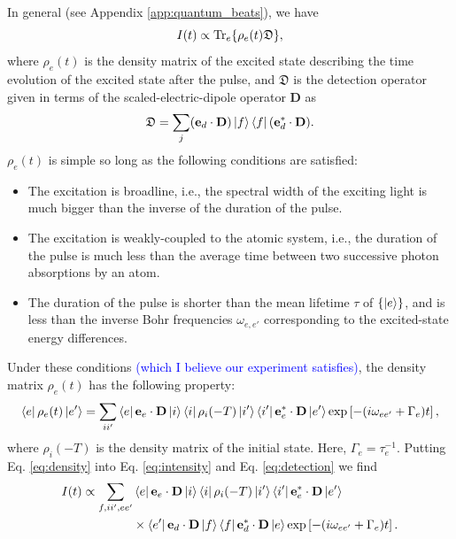 \documentclass[11pt]{article}
\newcommand{\lb}{\left[}
\newcommand{\rb}{\right]}
\begin{document}
In general (see Appendix \ref{app:quantum_beats}), we have
\begin{equation}\label{eq:intensity}
I(t) \propto \Tr_e\{   \rho_e(t) \mathfrak{D}  \},
\end{equation}
where $\rho_e(t)$ is the density matrix of the excited state describing the time evolution of the excited state after the pulse, and $\mathfrak{D}$ is the detection operator given in terms of the scaled-electric-dipole operator $\mathbf{D}$ as 
\begin{equation}\label{eq:detection}
\mathfrak{D} = \sum_j (\mathbf{e}_d \cdot \mathbf{D}) \ket{f}\bra{f}(\mathbf{e}_d^* \cdot \mathbf{D}).
\end{equation}
$\rho_e(t)$ is simple so long as the following conditions are satisfied:
\begin{itemize}
	\item The excitation is broadline, i.e., the spectral width of the exciting light is much bigger than the inverse of the duration of the pulse. 
	\item The excitation is weakly-coupled to the atomic system, i.e., the duration of the pulse is much less than the average time between two successive photon absorptions by an atom. 
	\item The duration of the pulse is shorter than the mean lifetime $\tau$ of $\{ \ket{e} \}$, and is less than the inverse Bohr frequencies $\omega_{e,e'}$ corresponding to the excited-state energy differences. 
\end{itemize}
Under these conditions \textcolor{blue}{(which I believe our experiment satisfies)}, the density matrix $\rho_e(t)$ has the following property:
\begin{equation}\label{eq:density}
\bra{e} \rho_e(t) \ket{e'} = \sum_{ii'} \bra{e} \mathbf{e}_e \cdot \mathbf{D} \ket{i} \bra{i} \rho_i(-T) \ket{i'} \bra{i'} \mathbf{e}_e^* \cdot \mathbf{D} \ket{e'} \exp\lb -(i\omega_{ee'} + \Gamma_e) t \rb,
\end{equation}
where $\rho_i(-T)$ is the density matrix of the initial state. Here, $\Gamma_e = \tau_e^{-1}$. Putting Eq. \ref{eq:density} into Eq. \ref{eq:intensity} and Eq. \ref{eq:detection} we find
\begin{align}
I(t) \propto \sum_{f,ii',ee'} &\bra{e} \mathbf{e}_e \cdot \mathbf{D} \ket{i} \bra{i} \rho_i(-T) \ket{i'} \bra{i'} \mathbf{e}_e^* \cdot \mathbf{D} \ket{e'} \nonumber \\
&\times \bra{e'}\mathbf{e}_d \cdot \mathbf{D} \ket{f}\bra{f}\mathbf{e}_d^* \cdot \mathbf{D} \ket{e} \exp\lb -(i\omega_{ee'} + \Gamma_e) t \rb.
\end{align}
\end{document}
